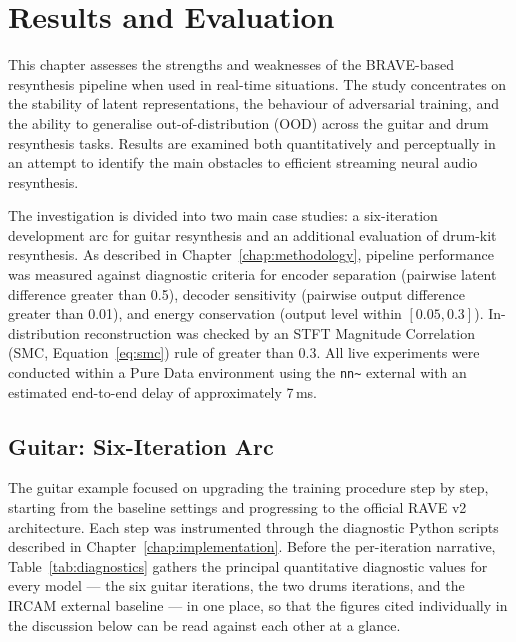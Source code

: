 \documentclass[a4paper,11pt,oneside,openany]{book}
\begin{document}
\chapter{Results and Evaluation}\label{chap:results}

This chapter assesses the strengths and weaknesses of the BRAVE-based resynthesis pipeline when used in real-time situations. The study concentrates on the stability of latent representations, the behaviour of adversarial training, and the ability to generalise out-of-distribution (OOD) across the guitar and drum resynthesis tasks. Results are examined both quantitatively and perceptually in an attempt to identify the main obstacles to efficient streaming neural audio resynthesis.

The investigation is divided into two main case studies: a six-iteration development arc for guitar resynthesis and an additional evaluation of drum-kit resynthesis. As described in Chapter~\ref{chap:methodology}, pipeline performance was measured against diagnostic criteria for encoder separation (pairwise latent difference greater than 0.5), decoder sensitivity (pairwise output difference greater than 0.01), and energy conservation (output level within $[0.05, 0.3]$). In-distribution reconstruction was checked by an STFT Magnitude Correlation (SMC, Equation~\eqref{eq:smc}) rule of greater than 0.3. All live experiments were conducted within a Pure Data environment using the \texttt{nn\textasciitilde} external with an estimated end-to-end delay of approximately 7\,ms.

\section{Guitar: Six-Iteration Arc}\label{sec:guitar_arc}

The guitar example focused on upgrading the training procedure step by step, starting from the baseline settings and progressing to the official RAVE v2 architecture. Each step was instrumented through the diagnostic Python scripts described in Chapter~\ref{chap:implementation}. Before the per-iteration narrative, Table~\ref{tab:diagnostics} gathers the principal quantitative diagnostic values for every model --- the six guitar iterations, the two drums iterations, and the IRCAM external baseline --- in one place, so that the figures cited individually in the discussion below can be read against each other at a glance.
\end{document}
